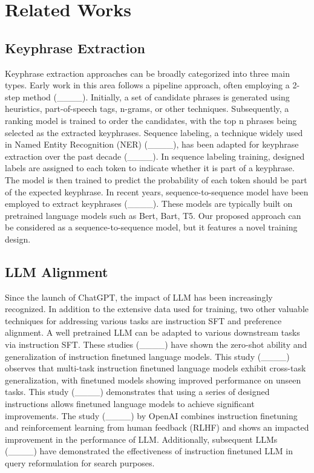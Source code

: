 \section{Related Works}
\subsection{Keyphrase Extraction}
Keyphrase extraction approaches can be broadly categorized into three main types. Early work in this area follows a pipeline approach, often employing a 2-step method (____). Initially, a set of candidate phrases is generated using heuristics, part-of-speech tags, n-grams, or other techniques. Subsequently, a ranking model is trained to order the candidates, with the top n phrases being selected as the extracted keyphrases. Sequence labeling, a technique widely used in Named Entity Recognition (NER) (____), has been adapted for keyphrase extraction over the past decade (____). In sequence labeling training, designed labels are assigned to each token to indicate whether it is part of a keyphrase. The model is then trained to predict the probability of each token should be part of the expected keyphrase. In recent years, sequence-to-sequence model have been employed to extract keyphrases (____). These models are typically built on pretrained language models such as Bert, Bart, T5. Our proposed approach can be considered as a sequence-to-sequence model, but it features a novel training design.

\subsection{LLM Alignment}
Since the launch of ChatGPT, the impact of LLM has been increasingly recognized. In addition to the extensive data used for training, two other valuable techniques for addressing various tasks are instruction SFT and preference alignment. A well pretrained LLM can be adapted to various downstream tasks via instruction SFT. These studies (____) have shown the zero-shot ability and generalization of instruction finetuned language models. This study (____) observes that multi-task instruction finetuned language models exhibit cross-task generalization, with finetuned models showing improved performance on unseen tasks. This study (____) demonstrates that using a series of designed instructions allows finetuned language models to achieve significant improvements. The study (____) by OpenAI combines instruction finetuning and reinforcement learning from human feedback (RLHF) and shows an impacted improvement in the performance of LLM. Additionally, subsequent LLMs (____) have demonstrated the effectiveness of instruction finetuned LLM in query reformulation for search purposes.

